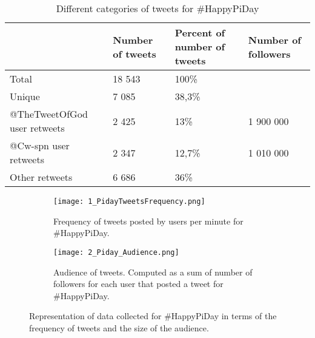 \documentclass[journal, a4paper, 12pt]{article}
\begin{document}
    
    \begin{table}[!hbt]
            \begin{center}
            \caption{Different categories of tweets for \#HappyPiDay}
            \label{tab:numberoftweets_piday}
            \begin{tabular}{|p{4cm}|p{2cm}|p{2cm}|p{2cm}|}
                  \hline
                   & Number of tweets & Percent of number of tweets & Number of followers \\
            \hline
                  Total & 18 543 & 100\% & \\
                  \hline
                  Unique & 7 085  &  38,3\%  & \\
                  \hline
                  @TheTweetOfGod user retweets & 2 425 & 13\% & 1 900 000\\
            \hline
            @Cw-spn user retweets & 2 347 & 12,7\% & 1 010 000\\
                  \hline
            Other retweets & 6 686 & 36\% &\\
                  \hline
            \end{tabular}
            \end{center}
      \end{table}
    
    
    \begin{figure}[!hbt]
\begin{subfigure}{1\textwidth}
\texttt{[image: 1\_PidayTweetsFrequency.png]}
\caption{Frequency of tweets posted by users per minute for \#HappyPiDay.}
\label{fig:piday_freq_tweets}
\end{subfigure}
\begin{subfigure}{1\textwidth}
\texttt{[image: 2\_Piday\_Audience.png]}
\caption{Audience of tweets. Computed as a sum of number of followers for each user that posted a tweet for \#HappyPiDay.}
\label{fig:piday_audience}
\end{subfigure}
 
\caption{Representation of data collected for \#HappyPiDay in terms of the frequency of tweets and the size of the audience.}
\label{fig:piday_tweets_and_audience}
\end{figure}
   
\end{document}
